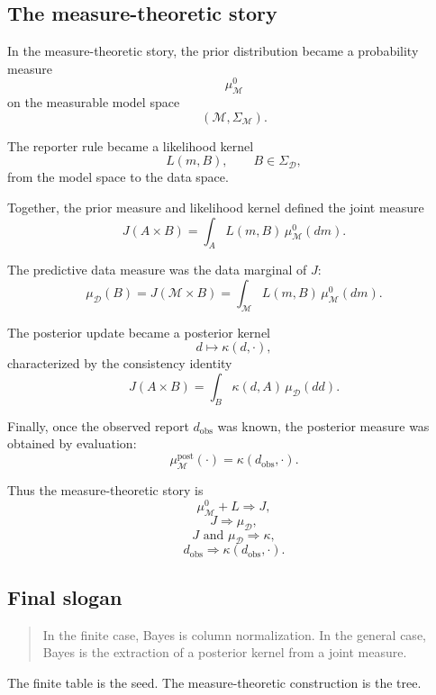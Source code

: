 \documentclass[11pt]{article}
\newcommand{\M}{\mathcal{M}}
\newcommand{\D}{\mathcal{D}}
\newcommand{\SigmaM}{\Sigma_{\M}}
\newcommand{\SigmaD}{\Sigma_{\D}}
\newcommand{\muMzero}{\mu^0_{\M}}
\newcommand{\muD}{\mu_{\D}}
\newcommand{\dobs}{d_{\mathrm{obs}}}
\begin{document}
\subsection{The measure-theoretic story}

In the measure-theoretic story, the prior distribution became a probability measure
\[
    \muMzero
\]
on the measurable model space
\[
    (\M,\SigmaM).
\]

The reporter rule became a likelihood kernel
\[
    L(m,B),
    \qquad
    B\in\SigmaD,
\]
from the model space to the data space.

Together, the prior measure and likelihood kernel defined the joint measure
\[
    J(A\times B)
    =
    \int_A L(m,B)\,\muMzero(dm).
\]

The predictive data measure was the data marginal of \(J\):
\[
    \muD(B)
    =
    J(\M\times B)
    =
    \int_{\M} L(m,B)\,\muMzero(dm).
\]

The posterior update became a posterior kernel
\[
    d\longmapsto \kappa(d,\cdot),
\]
characterized by the consistency identity
\[
    J(A\times B)
    =
    \int_B \kappa(d,A)\,\muD(dd).
\]

Finally, once the observed report \(\dobs\) was known, the posterior measure was obtained by evaluation:
\[
    \mu^{\mathrm{post}}_{\M}(\cdot)
    =
    \kappa(\dobs,\cdot).
\]

Thus the measure-theoretic story is
\[
    \muMzero
    +
    L
    \Longrightarrow
    J,
\]
\[
    J
    \Longrightarrow
    \muD,
\]
\[
    J
    \text{ and }
    \muD
    \Longrightarrow
    \kappa,
\]
\[  
    \dobs
    \Longrightarrow
    \kappa(\dobs,\cdot).
\]

\subsection{Final slogan}

\begin{quote}
    In the finite case, Bayes is column normalization. In the general case, Bayes is the extraction of a posterior kernel from a joint measure.
\end{quote}

The finite table is the seed. The measure-theoretic construction is the tree.

\appendix
\end{document}
